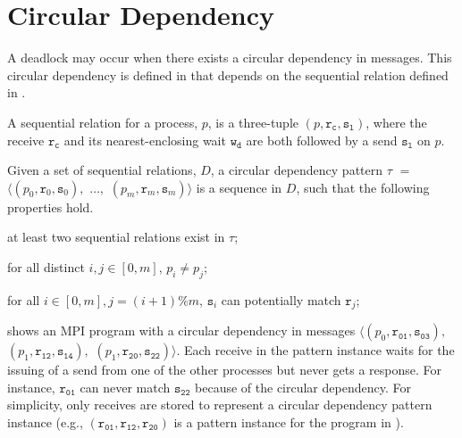 \section{Circular Dependency}



A deadlock may occur when there exists a circular dependency in messages. This circular dependency is defined in  that depends on the sequential relation defined in .

\begin{definition}
A sequential relation for a process, $p$, is a three-tuple $(p, \mathtt{r_c}, \mathtt{s_l})$, where the receive $\mathtt{r_c}$ and its nearest-enclosing wait $\mathtt{w_d}$ are both followed by a send $\mathtt{s_l}$ on $p$. 
\label{def:seqrelation}
\end{definition}

\begin{definition}
Given a set of sequential relations, $D$, a circular dependency pattern $\tau$ $=$ $\langle(p_0, \mathtt{r}_0, \mathtt{s}_0),$ $\ldots,$ $(p_m, \mathtt{r}_m, \mathtt{s}_m)\rangle$ is a sequence in $D$, such that the following properties hold.
\begin{compactenum}
\item at least two sequential relations exist in $\tau$;
\item for all distinct $i,j \in [0,m]$, $p_i \neq p_j$;
\item for all $i \in [0,m], j = (i+1) \% m$, $\mathtt{s}_i$ can potentially match $\mathtt{r}_j$;
\end{compactenum}
\label{def:circular}
\end{definition}

\examplefigthree

 shows an MPI program with a circular dependency in messages $\langle(p_0, \mathtt{r_{01}}, \mathtt{s_{03}}),$ $(p_1, \mathtt{r_{12}}, \mathtt{s_{14}}),$ $(p_1, \mathtt{r_{20}}, \mathtt{s_{22}})\rangle$. Each receive in the pattern instance waits for the issuing of a send from one of the other processes but never gets a response. For instance, $\mathtt{r_{01}}$ can never match $\mathtt{s_{22}}$ because of the circular dependency. For simplicity, only receives are stored to represent a circular dependency pattern instance (e.g., $(\mathtt{r_{01}}, \mathtt{r_{12}}, \mathtt{r_{20}})$ is a pattern instance for the program in ). 

